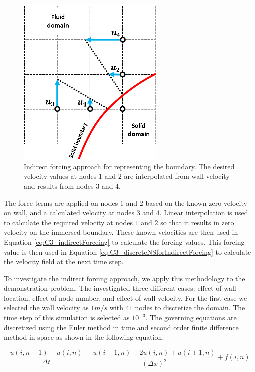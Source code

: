 \begin{figure}[H]
	\centering
	\includegraphics[width=7.00cm]{Chapter_3/figure/indirect_forcing_approach.png}
	\caption{Indirect forcing approach for representing the boundary. The desired velocity values at nodes $1$ and $2$ are interpolated from wall velocity and results from nodes $3$ and $4$.}
	\label{fig:C3_indiredctForcingMethod}
\end{figure}

The force terms are applied on nodes $1$ and $2$ based on the known zero velocity on wall, and a calculated velocity at nodes $3$ and $4$. Linear interpolation is used to calculate the required velocity at nodes $1$ and $2$ so that it results in zero velocity on the immersed boundary. These known velocities are then used in Equation \ref{eq:C3_indirectForceing} to calculate the forcing values. This forcing value is then used in Equation \ref{eq:C3_discreteNSforIndirectForcing} to calculate the velocity field at the next time step.

To investigate the indirect forcing approach, we apply this methodology to the demonstration problem. The investigated three different cases: effect of wall location, effect of node number, and effect of wall velocity. For the first case we selected the wall velocity as $1 m/s$ with $41$ nodes to discretize the domain. The time step of this simulation is selected as $10^{-3}$. The governing equations are discretized using the Euler method in time and second order finite difference method in space as shown in the following equation.

\begin{equation}
	\frac{u(i, n+1) - u(i, n)}{\Delta t} = \frac{u(i - 1, n) - 2u(i, n) + u(i + 1, n)}{(\Delta x)^2} + f(i, n)
\end{equation}

